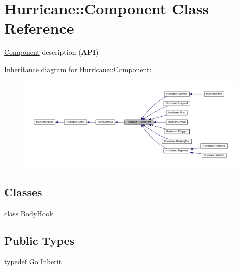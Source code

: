 \hypertarget{classHurricane_1_1Component}{}\section{Hurricane\+:\+:Component Class Reference}
\label{classHurricane_1_1Component}


\hyperlink{classHurricane_1_1Component}{Component} description ({\bfseries A\+PI})  




Inheritance diagram for Hurricane\+:\+:Component\+:\nopagebreak
\begin{figure}[H]
\begin{center}
\leavevmode
\includegraphics[width=350pt]{classHurricane_1_1Component__inherit__graph}
\end{center}
\end{figure}
\subsection*{Classes}
\begin{DoxyCompactItemize}
\item 
class \hyperlink{classHurricane_1_1Component_1_1BodyHook}{Body\+Hook}
\end{DoxyCompactItemize}
\subsection*{Public Types}
\begin{DoxyCompactItemize}
\item 
typedef \hyperlink{classHurricane_1_1Go}{Go} \hyperlink{classHurricane_1_1Component_a3911e94f9d220eb809d349b1181034e3}{Inherit}
\end{DoxyCompactItemize}
